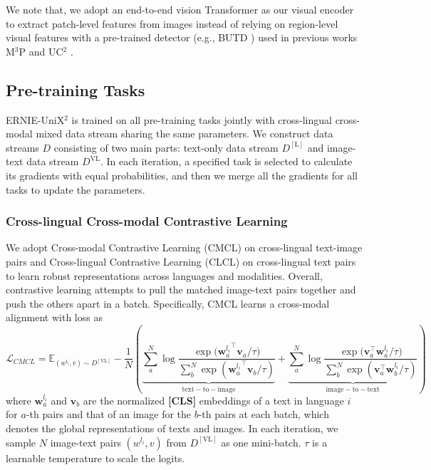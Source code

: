 \documentclass{article}
\begin{document}
We note that, we adopt an end-to-end vision Transformer as our visual encoder to extract patch-level features from images instead of relying on region-level visual features with a pre-trained detector (e.g., BUTD \cite{anderson2018bottom}) used in previous works M$^3$P \cite{m3p2020} and UC$^2$ \cite{UC22021}. 
\subsection{Pre-training Tasks}
\label{Objectives}
ERNIE-UniX$^2$ is trained on all pre-training tasks jointly with cross-lingual cross-modal mixed data stream sharing the same parameters. We construct data streams $D$ consisting of two main parts: text-only data stream $D^{[\mathrm{L}]}$ and image-text data stream $D^{\mathrm{VL}}$. In each iteration, a specified task is selected to calculate its gradients with equal probabilities, and then we merge all the gradients for all tasks to update the parameters.  
\subsubsection{Cross-lingual Cross-modal Contrastive Learning}
\label{Understanding}
We adopt Cross-modal Contrastive Learning (CMCL) on cross-lingual text-image pairs and Cross-lingual Contrastive Learning (CLCL) on cross-lingual text pairs to learn robust representations across languages and modalities. Overall, contrastive learning attempts to pull the matched image-text pairs together and push the others apart in a batch. Specifically, CMCL learns a cross-modal alignment with loss as
\begin{equation}
\mathcal{L}_{CMCL}=\mathbb{E}_{(w^{l_i},v)\sim D^{[\mathrm{VL}]}}-\frac{1}{N}(\underbrace{ \sum_{a}^{N}\log\frac{{\exp{(\mathbf{w}_{a}^{l_i}}^\top}\mathbf{v}_{a}/\tau)}{\sum_{b}^{N}\exp{({\mathbf{w}_{a}^{l_i}}^{\top}\mathbf{v}_b/\tau)}}}_{\mathrm{text-to-image}}+\underbrace{\sum_{a}^{N}\log\frac{{\exp{(\mathbf{v}_{a}^\top}}\mathbf{w}^{l_i}_{a}/\tau)}{\sum_{b}^{N}\exp{({\mathbf{v}_a^\top}\mathbf{w}^{l_i}_b/\tau)}}}_{\mathrm{image-to-text}})  
\end{equation}
where $\mathbf{w}_{a}^{l_i}$ and $\mathbf{v}_b$ are the normalized \textbf{[CLS]} embeddings of a text in language $i$ for $a$-th pairs and that of an image for the $b$-th pairs at each batch, which denotes the global representations of texts and images. In each iteration, we sample $N$ image-text pairs $(w^{l_i},v)$ from $D^{\mathrm{[VL]}}$ as one mini-batch. $\tau$ is a learnable temperature to scale the logits. 
\end{document}
